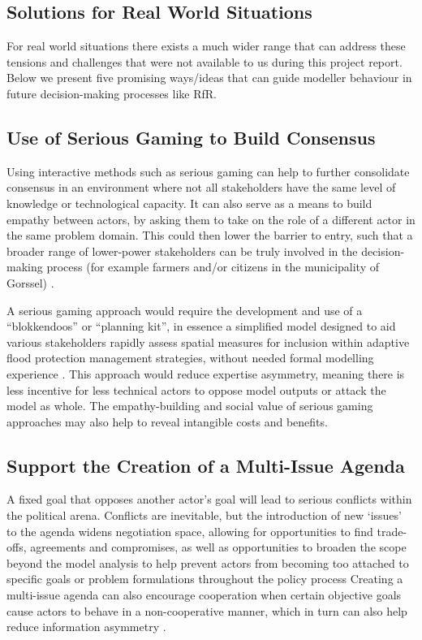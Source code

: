 \subsection{Solutions for Real World Situations }

For real world situations there exists a much wider range that can address these tensions and challenges that were not available to us during this project report. Below we present five promising ways/ideas that can guide modeller behaviour in future decision-making processes like RfR.

\subsection{Use of Serious Gaming to Build Consensus}

Using interactive methods such as serious gaming can help to further consolidate consensus in an environment where not all stakeholders have the same level of knowledge or technological capacity. It can also serve as a means to build empathy between actors, by asking them to take on the role of a different actor in the same problem domain. This could then lower the barrier to entry, such that a broader range of lower-power stakeholders can be truly involved in the decision-making process (for example farmers and/or citizens in the municipality of Gorssel) \parencite{savic_serious_2016}.

A serious gaming approach would require the development and use of a “blokkendoos” or “planning kit”, in essence a simplified model designed to aid various stakeholders rapidly assess spatial measures for inclusion within adaptive flood protection management strategies, without needed formal modelling experience \parencite{warren_collaborative_2015}. This approach would reduce expertise asymmetry, meaning there is less incentive for less technical actors to oppose model outputs or attack the model as whole. The empathy-building and social value of serious gaming approaches may also help to reveal intangible costs and benefits. 

\subsection{Support the Creation of a Multi-Issue Agenda} 

A fixed goal that opposes another actor’s goal will lead to serious conflicts within the political arena. Conflicts are inevitable, but the introduction of new ‘issues’ to the agenda widens negotiation space, allowing for opportunities to find trade-offs, agreements and compromises, as well as opportunities to broaden the scope beyond the model analysis to help prevent actors from becoming too attached to specific goals or problem formulations throughout the policy process \parencite{hans_de_bruijn_mark_de_bruijne_ernst_ten_heuvelhof_politics_2015} Creating a multi-issue agenda can also encourage cooperation when certain objective goals cause actors to behave in a non-cooperative manner, which in turn can also help reduce information asymmetry \parencite{coehoorn_learning_2004}.

